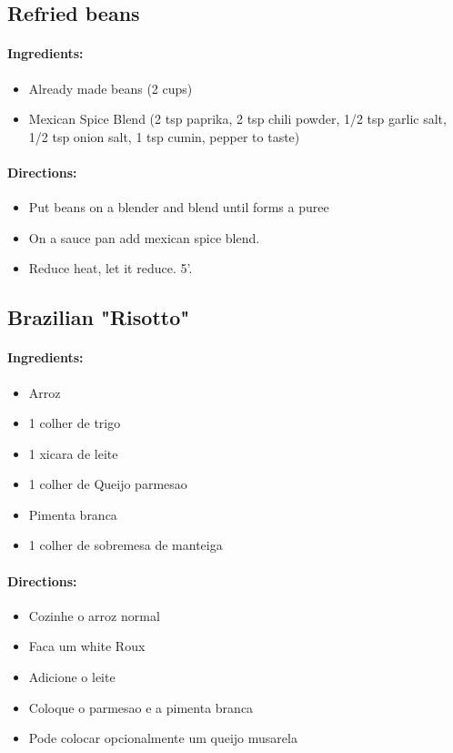 \documentclass{article}
\begin{document}
\subsection{Refried beans}

\paragraph{Ingredients:}

\begin{itemize}
	\item Already made beans (2 cups)
	\item Mexican Spice Blend (2 tsp paprika, 2 tsp chili powder, 1/2 tsp garlic salt, 1/2 tsp onion salt, 1 tsp cumin, pepper to taste)
\end{itemize}

\paragraph{Directions:}
\begin{itemize}
	\item Put beans on a blender and blend until forms a puree
	\item On a sauce pan add mexican spice blend.
	\item Reduce heat, let it reduce. 5'.
\end{itemize} 

\subsection{Brazilian "Risotto"}

\paragraph{Ingredients:}

\begin{itemize}
	\item Arroz
	\item 1 colher de trigo
	\item 1 xicara de leite
	\item 1 colher de Queijo parmesao
	\item Pimenta branca
	\item 1 colher de sobremesa de manteiga
\end{itemize}

\paragraph{Directions:}
\begin{itemize}
	\item Cozinhe o arroz normal
	\item Faca um white Roux
	\item Adicione o leite
	\item Coloque o parmesao e a pimenta branca
	\item Pode colocar opcionalmente um queijo musarela
\end{itemize} 
\end{document}
